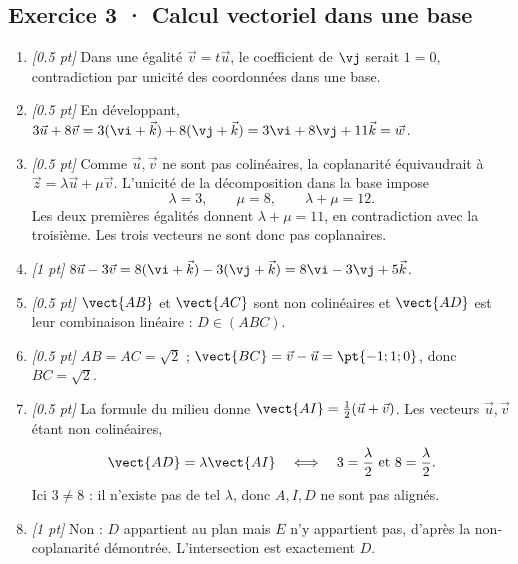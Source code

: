 \subsection*{Exercice 3 · Calcul vectoriel dans une base}\begin{enumerate}

\item \textit{[\num{0,5} pt]} Dans une égalité $\vec v=t\vec u$, le coefficient de $\vj $ serait $1=0$, contradiction par unicité des coordonnées dans une base.

\item \textit{[\num{0,5} pt]} En développant, $3\vec u+8\vec v=3(\vi +\vec k)+8(\vj +\vec k)=3\vi +8\vj +11\vec k=\vec w$.

\item \textit{[\num{0,5} pt]} Comme $\vec u,\vec v$ ne sont pas colinéaires, la coplanarité équivaudrait à $\vec z=\lambda\vec u+\mu\vec v$. L'unicité de la décomposition dans la base impose
\[\lambda=3,\qquad\mu=8,\qquad\lambda+\mu=12.\]
Les deux premières égalités donnent $\lambda+\mu=11$, en contradiction avec la troisième. Les trois vecteurs ne sont donc pas coplanaires.

\item \textit{[1 pt]} $8\vec u-3\vec v=8(\vi +\vec k)-3(\vj +\vec k)=8\vi -3\vj +5\vec k$.

\item \textit{[\num{0,5} pt]} $\vect{AB}$ et $\vect{AC}$ sont non colinéaires et $\vect{AD}$ est leur combinaison linéaire : $D\in(ABC)$.

\item \textit{[\num{0,5} pt]} $AB=AC=\sqrt2$ ; $\vect{BC}=\vec v-\vec u=\pt{-1;1;0}$, donc $BC=\sqrt2$.

\item \textit{[\num{0,5} pt]} La formule du milieu donne $\vect{AI}=\frac12(\vec u+\vec v)$. Les vecteurs $\vec u,\vec v$ étant non colinéaires,
\[\vect{AD}=\lambda\vect{AI}\quad\Longleftrightarrow\quad 3=\frac{\lambda}{2}\ \text{et}\ 8=\frac{\lambda}{2}.\]
Ici $3\ne 8$ : il n'existe pas de tel $\lambda$, donc $A,I,D$ ne sont pas alignés.

\item \textit{[1 pt]} Non : $D$ appartient au plan mais $E$ n'y appartient pas, d'après la non-coplanarité démontrée. L'intersection est exactement $D$.

\end{enumerate}

